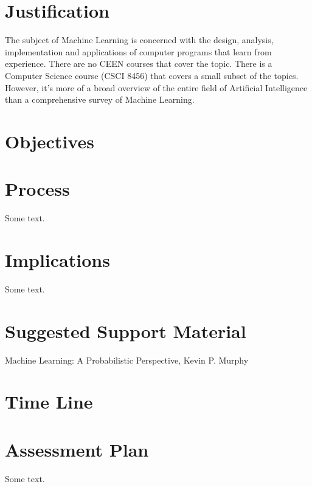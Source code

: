 \documentclass[12pt]{article}
\begin{document}
\newpage


\section{Justification}

The subject of Machine Learning is concerned with the design, analysis, implementation
and applications of computer programs that learn from experience. There are no CEEN courses
that cover the topic. There is a Computer Science course (CSCI 8456) that covers a small subset
of the topics. However, it's more of a broad overview of the entire field of Artificial
Intelligence than a comprehensive survey of Machine Learning. 

\section{Objectives}



\section{Process}

Some text.

\section{Implications}

Some text.

\section{Suggested Support Material}

Machine Learning: A Probabilistic Perspective, Kevin P. Murphy

\section{Time Line}

\section{Assessment Plan}

Some text.
\end{document}
